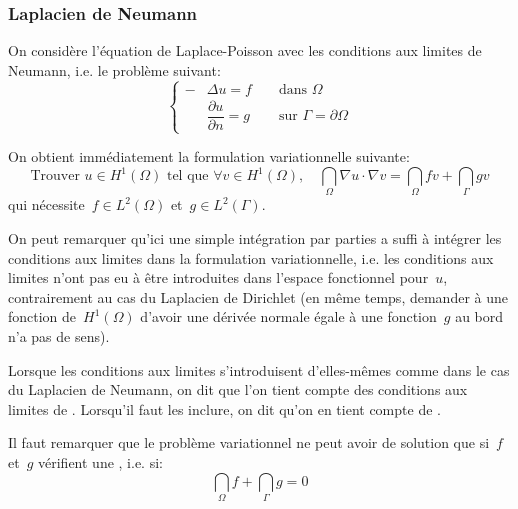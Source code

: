 \medskip
\subsubsection{Laplacien de Neumann}
On considère l'équation de Laplace-Poisson avec les conditions aux limites de Neumann, i.e. le problème suivant:
\begin{equation}\left\{\begin{aligned}
-&\Delta u=f &&\text{ dans } \Omega\\
&\dfrac{\partial u}{\partial n}=g &&\text{ sur } \Gamma=\partial\Omega
\end{aligned}
\right.
\end{equation}

\medskip
On obtient immédiatement la formulation variationnelle suivante:
\begin{equation}
\text{Trouver } u \in H^1(\Omega) \text{ tel que }
\forall v\in H^1(\Omega),\quad \dint_\Omega \nabla u\cdot\nabla v = \dint_\Omega fv + \dint_\Gamma gv
\end{equation}
qui nécessite~$f\in L^2(\Omega)$ et~$g\in L^2(\Gamma)$.

\medskip
On peut remarquer qu'ici une simple intégration par parties a suffi à intégrer les conditions aux limites dans la formulation variationnelle, i.e. les conditions aux limites n'ont pas eu à être introduites dans l'espace fonctionnel pour~$u$, contrairement au cas du Laplacien de Dirichlet (en même temps, demander à une fonction de~$H^1(\Omega)$ d'avoir une dérivée normale égale à une fonction~$g$ au bord n'a pas de sens).

Lorsque les conditions aux limites s'introduisent d'elles-mêmes comme dans le cas du Laplacien de Neumann, on dit que l'on tient compte des conditions aux limites de . Lorsqu'il faut les inclure, on dit qu'on en tient compte de .

\medskip
Il faut remarquer que le problème variationnel ne peut avoir de solution que si~$f$ et~$g$ vérifient une , i.e. si:
\begin{equation}
\dint_\Omega f + \dint_\Gamma g = 0
\end{equation}

